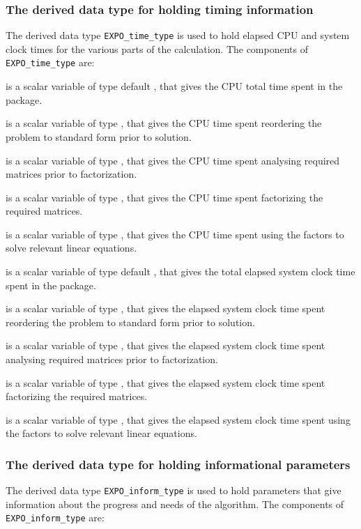 \documentclass{galahad}
\newcommand{\packagename}{EXPO}
\begin{document}
\subsubsection{The derived data type for holding timing
 information}\label{typetime}
The derived data type
{\tt \packagename\_time\_type}
is used to hold elapsed CPU and system clock times for the various parts
of the calculation. The components of
{\tt \packagename\_time\_type}
are:
\begin{description}
 is a scalar variable of type default \real, that gives
 the CPU total time spent in the package.

 is a scalar variable of type \realdp, that gives
 the CPU time spent reordering the problem to standard form prior to solution.

 is a scalar variable of type \realdp, that gives
 the CPU time spent analysing required matrices prior to factorization.

 is a scalar variable of type \realdp, that gives
 the CPU time spent factorizing the required matrices.

 is a scalar variable of type \realdp, that gives
 the CPU time spent using the factors to solve relevant linear equations.

 is a scalar variable of type default \real, that gives
 the total elapsed system clock time spent in the package.

 is a scalar variable of type \realdp, that gives
 the elapsed system clock time spent reordering the problem to standard form
prior to solution.

 is a scalar variable of type \realdp, that gives
 the  elapsed system clock time spent analysing required matrices prior to
factorization.

 is a scalar variable of type \realdp, that gives
 the  elapsed system clock time spent factorizing the required matrices.

 is a scalar variable of type \realdp, that gives
 the  elapsed system clock time spent using the factors to solve relevant
linear equations.

\end{description}


\subsubsection{The derived data type for holding informational
 parameters}\label{typeinform}
The derived data type
{\tt \packagename\_inform\_type}
is used to hold parameters that give information about the progress and needs
of the algorithm. The components of
{\tt \packagename\_inform\_type}
are:
\end{document}
